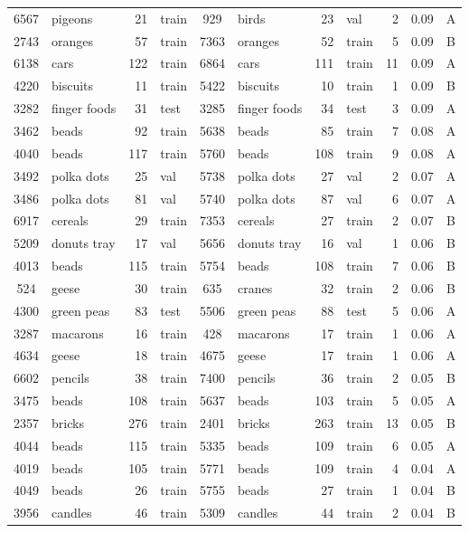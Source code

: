 \begin{tabular}{clrlclrlrlc}
6567 & pigeons & 21 & train & 929 & birds & 23 & val & 2 & 0.09 & A\\
2743 & oranges & 57 & train & 7363 & oranges & 52 & train & 5 & 0.09 & B\\
6138 & cars & 122 & train & 6864 & cars & 111 & train & 11 & 0.09 & A\\
4220 & biscuits & 11 & train & 5422 & biscuits & 10 & train & 1 & 0.09 & B\\
3282 & finger foods & 31 & test & 3285 & finger foods & 34 & test & 3 & 0.09 & A\\
3462 & beads & 92 & train & 5638 & beads & 85 & train & 7 & 0.08 & A\\
4040 & beads & 117 & train & 5760 & beads & 108 & train & 9 & 0.08 & A\\
3492 & polka dots & 25 & val & 5738 & polka dots & 27 & val & 2 & 0.07 & A\\
3486 & polka dots & 81 & val & 5740 & polka dots & 87 & val & 6 & 0.07 & A\\
6917 & cereals & 29 & train & 7353 & cereals & 27 & train & 2 & 0.07 & B\\
5209 & donuts tray & 17 & val & 5656 & donuts tray & 16 & val & 1 & 0.06 & B\\
4013 & beads & 115 & train & 5754 & beads & 108 & train & 7 & 0.06 & B\\
524 & geese & 30 & train & 635 & cranes & 32 & train & 2 & 0.06 & B\\
4300 & green peas & 83 & test & 5506 & green peas & 88 & test & 5 & 0.06 & A\\
3287 & macarons & 16 & train & 428 & macarons & 17 & train & 1 & 0.06 & A \\
4634 & geese & 18 & train & 4675 & geese & 17 & train & 1 & 0.06 & A\\
6602 & pencils & 38 & train & 7400 & pencils & 36 & train & 2 & 0.05 & B \\
3475 & beads & 108 & train & 5637 & beads & 103 & train & 5 & 0.05 & A\\
2357 & bricks & 276 & train & 2401 & bricks & 263 & train & 13 & 0.05 & B\\
4044 & beads & 115 & train & 5335 & beads & 109 & train & 6 & 0.05 & A\\
4019 & beads & 105 & train & 5771 & beads & 109 & train & 4 & 0.04 & A\\
4049 & beads & 26 & train & 5755 & beads & 27 & train & 1 & 0.04 & B\\
3956 & candles & 46 & train & 5309 & candles & 44 & train & 2 & 0.04 & B \\

\end{tabular}
